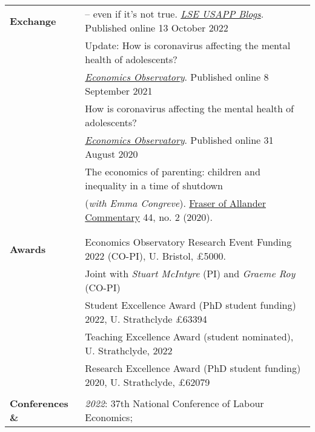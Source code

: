 \documentclass[11pt,a4paper]{article}
\begin{document}
\begin{longtable}{l l}
\textbf{Exchange} 									       &  – even if it’s not true. \href{https://bit.ly/3CVAiGP}{\textit{LSE USAPP Blogs}}. Published online 13 October 2022    \\
\addlinespace
																												 &  Update: How is coronavirus affecting the mental health of adolescents?    \\
 										 																		 &  \href{https://www.economicsobservatory.com/update-how-is-coronavirus-affecting-the-mental-health-of-adolescents}{\textit{Economics Observatory}}. Published online 8 September 2021    \\
\addlinespace
																												&  How is coronavirus affecting the mental health of adolescents?   \\
																												&  \href{https://www.economicsobservatory.com/how-coronavirus-affecting-mental-health-adolescents}{\textit{Economics Observatory}}. Published online 31 August 2020  \\		
\addlinespace
																												&  The economics of parenting: children and inequality in a time of shutdown  \\ 
																												& (\textit{with Emma Congreve}). \href{https://strathprints.strath.ac.uk/74641/}{Fraser of Allander Commentary} 44, no. 2 (2020).  \\
																												&   \\	
																												&  \\   %
\textbf{Awards}                            &  Economics Observatory Research Event Funding 2022 (CO-PI), U. Bristol, \pounds5000.   \\
																												&  Joint with \textit{Stuart McIntyre} (PI) and \textit{Graeme Roy} (CO-PI)   \\
\addlinespace
																												&  Student Excellence Award (PhD student funding) 2022, U. Strathclyde \pounds63394   \\
\addlinespace
																												& Teaching Excellence Award (student nominated), U. Strathclyde, 2022   \\																														
\addlinespace
																												&  Research Excellence Award (PhD student funding)	 2020, U. Strathclyde, \pounds62079   \\																									
                                                        &   \\
\textbf{Conferences \&}             &  \textit{2022}: 37th National Conference of Labour Economics;    \\ 

\end{longtable}
\end{document}
